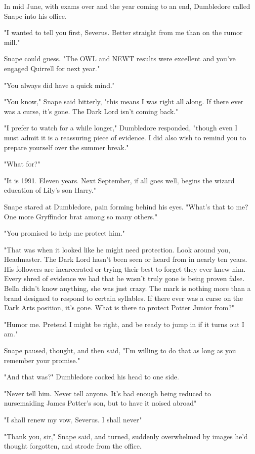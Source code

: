 In mid June, with exams over and the year coming to an end, Dumbledore called Snape into his office.

"I wanted to tell you first, Severus. Better straight from me than on the rumor mill."

Snape could guess. "The OWL and NEWT results were excellent and you've engaged Quirrell for next year."

"You always did have a quick mind."

"You know," Snape said bitterly, "this means I was right all along. If there ever was a curse, it's gone. The Dark Lord isn't coming back."

"I prefer to watch for a while longer," Dumbledore responded, "though even I must admit it is a reassuring piece of evidence. I did also wish to remind you to prepare yourself over the summer break."

"What for?"

"It is 1991. Eleven years. Next September, if all goes well, begins the wizard education of Lily's son Harry."

Snape stared at Dumbledore, pain forming behind his eyes. "What's that to me? One more Gryffindor brat among so many others."

"You promised to help me protect him."

"That was when it looked like he might need protection. Look around you, Headmaster. The Dark Lord hasn't been seen or heard from in nearly ten years. His followers are incarcerated or trying their best to forget they ever knew him. Every shred of evidence we had that he wasn't truly gone is being proven false. Bella didn't know anything, she was just crazy. The mark is nothing more than a brand designed to respond to certain syllables. If there ever was a curse on the Dark Arts position, it's gone. What is there to protect Potter Junior from?"

"Humor me. Pretend I might be right, and be ready to jump in if it turns out I am."

Snape paused, thought, and then said, "I'm willing to do that as long as you remember your promise."

"And that was?" Dumbledore cocked his head to one side.

"Never tell him. Never tell anyone. It's bad enough being reduced to nursemaiding James Potter's son, but to have it noised abroad{\el}"

"I shall renew my vow, Severus. I shall never{\el}"

"Thank you, sir," Snape said, and turned, suddenly overwhelmed by images he'd thought forgotten, and strode from the office.

